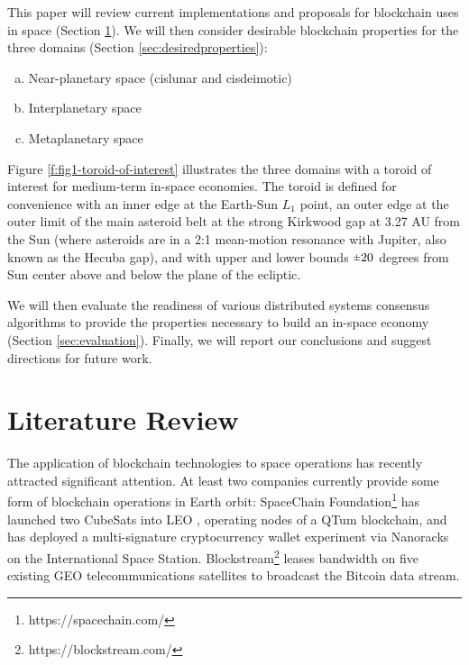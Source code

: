 \documentclass[]{aiaa-tc}%
\newcommand{\rpm}{\raisebox{.2ex}{$\scriptstyle\pm$}} %
\begin{document}
This paper will review current implementations and proposals for blockchain uses in space (Section \ref{sec:litreview}). We will then consider desirable blockchain properties for the three domains (Section \ref{sec:desiredproperties}): 
\begin{enumerate}[(a)] %
\item Near-planetary space (cislunar and cisdeimotic)
\item Interplanetary space
\item Metaplanetary space
\end{enumerate}

Figure \ref{f:fig1-toroid-of-interest} illustrates the three domains with a toroid of interest for medium-term in-space economies. The toroid is defined for convenience with an inner edge at the Earth-Sun $L_{1}$ point, an outer edge at the outer limit of the main asteroid belt at the strong Kirkwood gap at 3.27 AU from the Sun (where asteroids are in a 2:1 mean-motion resonance with Jupiter, also known as the Hecuba gap), and with upper and lower bounds $\rpm 20$ degrees from Sun center above and below the plane of the ecliptic.

We will then evaluate the readiness of various distributed systems consensus algorithms to provide the properties necessary to build an in-space economy (Section \ref{sec:evaluation}). Finally, we will report our conclusions and suggest directions for future work.


\section{Literature Review}\label{sec:litreview}

The application of blockchain technologies to space operations has recently attracted significant attention. At least two companies currently provide some form of blockchain operations in Earth orbit: SpaceChain Foundation\footnote{https://spacechain.com/} has launched two CubeSats into LEO
,
 operating nodes of a QTum blockchain, and has deployed a multi-signature cryptocurrency wallet experiment via Nanoracks on the International Space Station. Blockstream\footnote{https://blockstream.com/} leases bandwidth on five existing GEO telecommunications satellites to broadcast the Bitcoin data stream.
\end{document}
